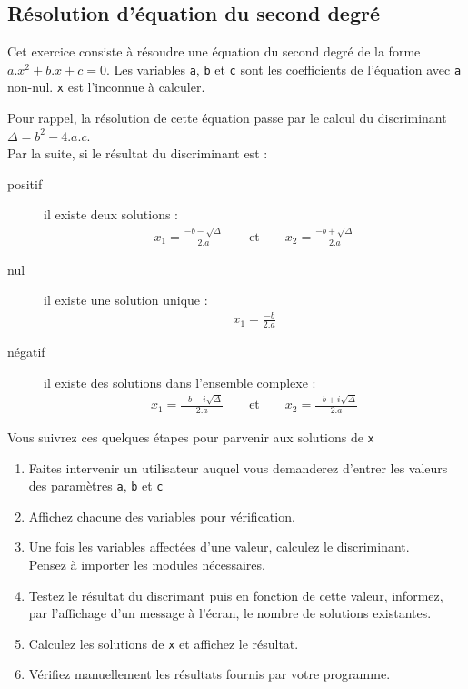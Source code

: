 
\subsection{Résolution d'équation du second degré}

Cet exercice  consiste à résoudre une  équation du second degré  de la
forme  $a.x^2+b.x+c =  0$.   Les variables  \texttt{a}, \texttt{b}  et
\texttt{c}  sont  les  coefficients   de  l'équation  avec  \texttt{a}
non-nul. \texttt{x} est l'inconnue à calculer.

Pour rappel,  la résolution de cette  équation passe par le  calcul du
discriminant $\Delta =  b^2-4.a.c$.\\ Par la suite, si  le résultat du
discriminant est :
\begin{description}
\item[positif] il existe deux solutions :
\begin{eqnarray*}
  x_1   =  \frac{-b-\sqrt{\Delta}}{2.a}   \qquad  \textrm{et}   \qquad
  x_2=\frac{-b+\sqrt{\Delta}}{2.a}
\end{eqnarray*}
\item[nul] il existe une solution unique :
\begin{eqnarray*}
  x_1 = \frac{-b}{2.a}
\end{eqnarray*}
\item[négatif] il existe des solutions dans l'ensemble complexe :
\begin{eqnarray*}
  x_1  =   \frac{-b-i\sqrt{\Delta}}{2.a}  \qquad   \textrm{et}  \qquad
  x_2=\frac{-b+i\sqrt{\Delta}}{2.a}
\end{eqnarray*}
\end{description}

Vous  suivrez  ces quelques  étapes  pour  parvenir aux  solutions  de
\texttt{x}


\begin{enumerate}

\item Faites intervenir un utilisateur auquel vous demanderez d'entrer
  les valeurs des paramètres \texttt{a}, \texttt{b} et \texttt{c}
\item Affichez chacune des variables pour vérification.
\item  Une fois  les  variables affectées  d'une  valeur, calculez  le
  discriminant.\\ Pensez à importer les modules nécessaires.
\item  Testez le  résultat du  discrimant  puis en  fonction de  cette
  valeur, informez, par l'affichage d'un  message à l'écran, le nombre
  de solutions existantes.
\item Calculez  les solutions de  \texttt{x} et affichez  le résultat.
\item Vérifiez manuellement les résultats fournis par votre programme.

\end{enumerate}
